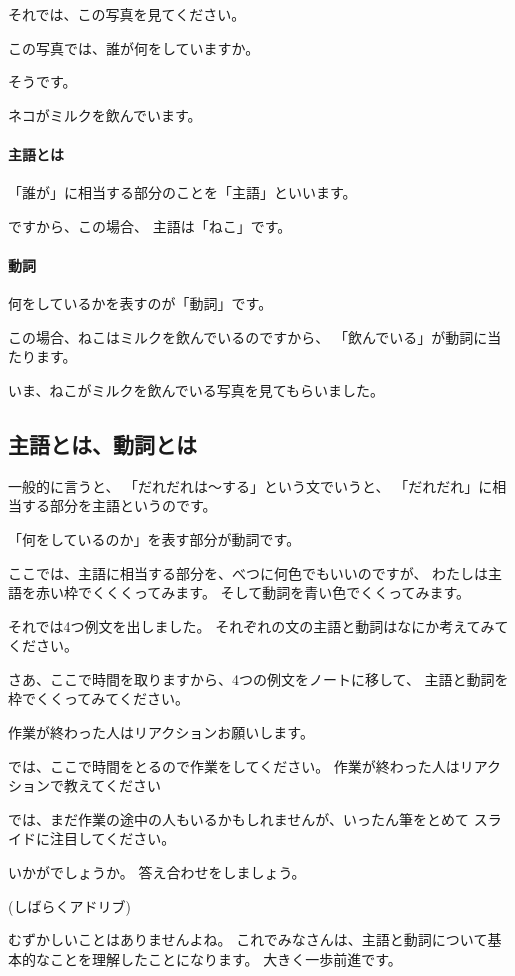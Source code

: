 \documentclass[book,jafontscale=0.9247]{jlreq}
\newcommand{\mySagyo}{%
\par%
\bigskip
では、ここで時間をとるので作業をしてください。
作業が終わった人はリアクションで教えてください\par%
\begin{minipage}[t]{.98\textwidth}
\mbox{}\hrulefill\mbox{}\par%
\mbox{}\hfill{}\raisebox{-.5\height}{作業}\hfill\mbox{}\par%
\mbox{}\hrulefill\mbox{}
\end{minipage}%
\par%
\bigskip%
では、まだ作業の途中の人もいるかもしれませんが、いったん筆をとめて
スライドに注目してください。%
\par%
\bigskip
}
\begin{document}
それでは、この写真を見てください。

この写真では、誰が何をしていますか。

そうです。

ネコがミルクを飲んでいます。

\paragraph{主語とは}
「誰が」に相当する部分のことを「主語」といいます。

ですから、この場合、
主語は「ねこ」です。

\paragraph{動詞}
何をしているかを表すのが「動詞」です。

この場合、ねこはミルクを飲んでいるのですから、
「飲んでいる」が動詞に当たります。

いま、ねこがミルクを飲んでいる写真を見てもらいました。

{\large \ComputerMouse}

\subsection{主語とは、動詞とは}


一般的に言うと、
「だれだれは〜する」という文でいうと、
「だれだれ」に相当する部分を主語というのです。

「何をしているのか」を表す部分が動詞です。

ここでは、主語に相当する部分を、べつに何色でもいいのですが、
わたしは主語を赤い枠でくくくってみます。
そして動詞を青い色でくくってみます。

{\large \ComputerMouse}

それでは4つ例文を出しました。
それぞれの文の主語と動詞はなにか考えてみてください。

さあ、ここで時間を取りますから、4つの例文をノートに移して、
主語と動詞を枠でくくってみてください。

作業が終わった人はリアクションお願いします。


\mySagyo


いかがでしょうか。
答え合わせをしましょう。

{\large \ComputerMouse}

(しばらくアドリブ)

むずかしいことはありませんよね。
これでみなさんは、主語と動詞について基本的なことを理解したことになります。
大きく一歩前進です。
\end{document}
